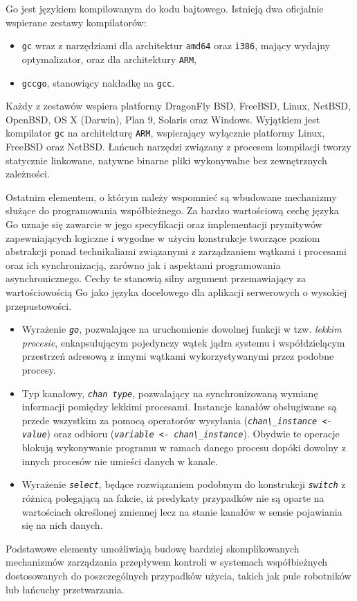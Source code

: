 \par{
  Go jest językiem kompilowanym do kodu bajtowego. Istnieją dwa oficjalnie wspierane zestawy kompilatorów:
  \begin{itemize}
    \item \texttt{gc} wraz z narzędziami dla architektur \texttt{amd64} oraz \texttt{i386}, mający wydajny optymalizator, oraz dla architektury \texttt{ARM},
    \item \texttt{gccgo}, stanowiący nakładkę na \texttt{gcc}.
  \end{itemize}
  Każdy z zestawów wspiera platformy DragonFly BSD, FreeBSD, Linux, NetBSD, OpenBSD, OS X (Darwin), Plan 9, Solaris oraz Windows. Wyjątkiem jest kompilator \texttt{gc} na architekturę \texttt{ARM}, wspierający wyłącznie platformy Linux, FreeBSD oraz NetBSD. \cite{godoc:compilers}
  Łańcuch narzędzi związany z procesem kompilacji tworzy statycznie linkowane, natywne binarne pliki wykonywalne bez zewnętrznych zależności.
}

\par{
  Ostatnim elementem, o którym należy wspomnieć są wbudowane mechanizmy służące do programowania współbieżnego.
  Za bardzo wartościową cechę języka Go uznaje się zawarcie w jego specyfikacji oraz implementacji prymitywów zapewniających logiczne i wygodne w użyciu konstrukcje tworzące poziom abstrakcji ponad technikaliami związanymi z zarządzaniem wątkami i procesami oraz ich synchronizacją, zarówno jak i aspektami programowania asynchronicznego.
  Cechy te stanowią silny argument przemawiający za wartościowością Go jako języka docelowego dla aplikacji serwerowych o wysokiej przepustowości.
  \begin{itemize}
    \item Wyrażenie \textit{\lstinline{go}}, pozwalające na uruchomienie dowolnej funkcji w tzw. \emph{lekkim procesie}, enkapsulującym pojedynczy wątek jądra systemu i współdzielącym przestrzeń adresową z innymi wątkami wykorzystywanymi przez podobne procesy.
    \item Typ kanałowy, \textit{\lstinline{chan type}}, pozwalający na synchronizowaną wymianę informacji pomiędzy lekkimi procesami. Instancje kanałów obsługiwane są przede wszystkim za pomocą operatorów wysyłania (\textit{\lstinline{chan\_instance <- value}}) oraz odbioru (\textit{\lstinline{variable <- chan\_instance}}). Obydwie te operacje blokują wykonywanie programu w ramach danego procesu dopóki dowolny z innych procesów nie umieści danych w kanale.
    \item Wyrażenie \textit{\lstinline{select}}, będące rozwiązaniem podobnym do konstrukcji \textit{\lstinline{switch}} z różnicą polegającą na fakcie, iż predykaty przypadków nie są oparte na wartościach określonej zmiennej lecz na stanie kanałów w sensie pojawiania się na nich danych.
  \end{itemize}
  Podstawowe elementy umożliwiają budowę bardziej skomplikowanych mechanizmów zarządzania przepływem kontroli w systemach współbieżnych dostosowanych do poszczególnych przypadków użycia, takich jak pule robotników lub łańcuchy przetwarzania.
}